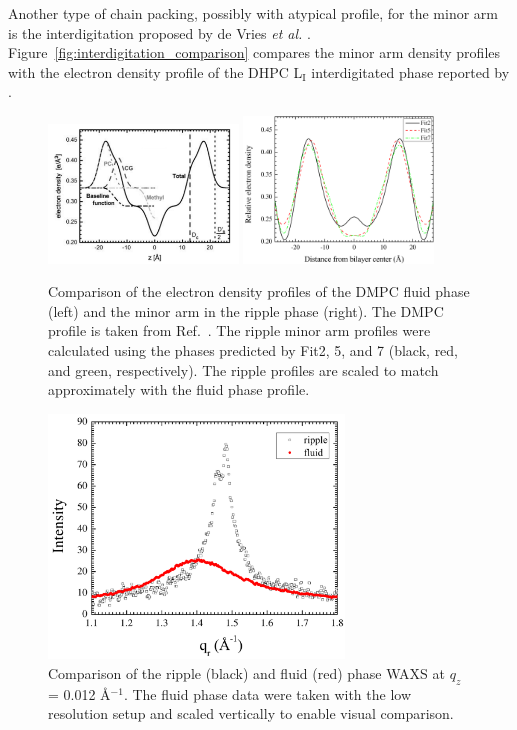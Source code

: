 Another type of chain packing, possibly with atypical profile, for the minor arm 
is the interdigitation proposed by de Vries \textit{et al.} \cite{ref:deVries05}.
Figure~\ref{fig:interdigitation_comparison} compares the minor arm density
profiles with the electron density profile of the DHPC L$_\text{I}$ interdigitated phase
reported by \cite{}.

\begin{figure}[htbp]
  \centering
  \includegraphics[width=0.45\textwidth]{figures/ripple/discussion/Kucerka_fluid_DMPC}
  \includegraphics[width=0.45\textwidth]{figures/ripple/discussion/minor_edp}
  \caption{Comparison of the electron density profiles of the DMPC fluid phase (left)
  and the minor arm in the ripple phase (right). The DMPC profile is taken from 
  Ref.~\cite{Kucerka05_BPJ}. The ripple minor arm profiles were calculated 
  using the phases predicted by Fit2, 5, and 7 (black, red, and green, respectively). 
  The ripple profiles are scaled to match approximately
  with the fluid phase profile.}
  \label{fig:fluid_comparison}
\end{figure}

\begin{figure}[htbp]
  \centering
  \includegraphics[width=0.7\textwidth]{figures/ripple/nGIWAXS/fluid_vs_ripple}
  \caption{Comparison of the ripple (black) and fluid (red) phase WAXS at $q_z$ = 0.012 \AA$^{-1}$.
  The fluid phase data were taken with the low resolution setup and scaled 
  vertically to enable visual comparison.}
  \label{fig:fluid_vs_ripple}
\end{figure}

